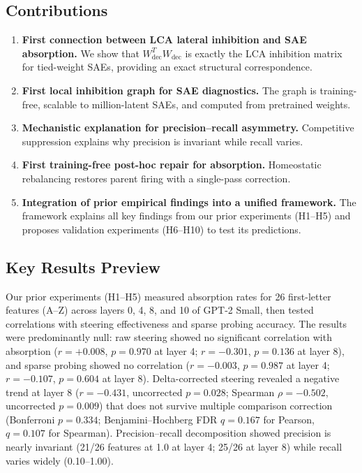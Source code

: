 \documentclass{article}
\begin{document}
\subsection{Contributions}

\begin{enumerate}
    \item \textbf{First connection between LCA lateral inhibition and SAE absorption.} We show that $W_{\text{dec}}^T W_{\text{dec}}$ is exactly the LCA inhibition matrix for tied-weight SAEs, providing an exact structural correspondence.
    \item \textbf{First local inhibition graph for SAE diagnostics.} The graph is training-free, scalable to million-latent SAEs, and computed from pretrained weights.
    \item \textbf{Mechanistic explanation for precision--recall asymmetry.} Competitive suppression explains why precision is invariant while recall varies.
    \item \textbf{First training-free post-hoc repair for absorption.} Homeostatic rebalancing restores parent firing with a single-pass correction.
    \item \textbf{Integration of prior empirical findings into a unified framework.} The framework explains all key findings from our prior experiments (H1--H5) and proposes validation experiments (H6--H10) to test its predictions.
\end{enumerate}

\subsection{Key Results Preview}

Our prior experiments (H1--H5) measured absorption rates for 26 first-letter features (A--Z) across layers 0, 4, 8, and 10 of GPT-2 Small, then tested correlations with steering effectiveness and sparse probing accuracy. The results were predominantly null: raw steering showed no significant correlation with absorption ($r = +0.008$, $p = 0.970$ at layer 4; $r = -0.301$, $p = 0.136$ at layer 8), and sparse probing showed no correlation ($r = -0.003$, $p = 0.987$ at layer 4; $r = -0.107$, $p = 0.604$ at layer 8). Delta-corrected steering revealed a negative trend at layer 8 ($r = -0.431$, uncorrected $p = 0.028$; Spearman $\rho = -0.502$, uncorrected $p = 0.009$) that does not survive multiple comparison correction (Bonferroni $p = 0.334$; Benjamini--Hochberg FDR $q = 0.167$ for Pearson, $q = 0.107$ for Spearman). Precision--recall decomposition showed precision is nearly invariant (21/26 features at 1.0 at layer 4; 25/26 at layer 8) while recall varies widely (0.10--1.00).
\end{document}
